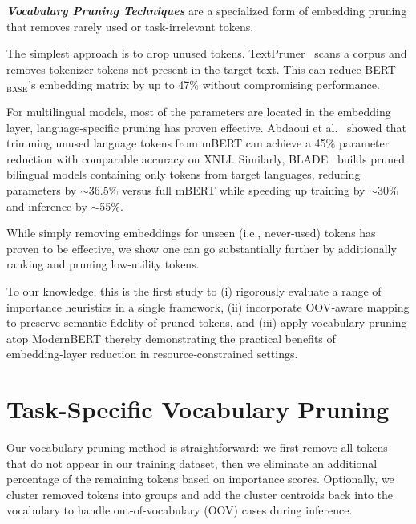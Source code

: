\documentclass[twocolumn]{article}
\begin{document}
\textit{\textbf{Vocabulary Pruning Techniques}} are a specialized form of embedding pruning that removes rarely used or task-irrelevant tokens.

The simplest approach is to drop unused tokens. TextPruner~\cite{shen2022textpruner} scans a corpus and removes tokenizer tokens not present in the target text. This can reduce BERT$_{\text{BASE}}$'s embedding matrix by up to 47\% without compromising performance.

For multilingual models, most of the parameters are located in the embedding layer, language-specific pruning has proven effective. Abdaoui et al.~\cite{abdaoui2020load} showed that trimming unused language tokens from mBERT can achieve a 45\% parameter reduction with comparable accuracy on XNLI. Similarly, BLADE~\cite{nair2023blade} builds pruned bilingual models containing only tokens from target languages, reducing parameters by $\sim$36.5\% versus full mBERT while speeding up training by $\sim$30\% and inference by $\sim$55\%.

While simply removing embeddings for unseen (i.e., never‑used) tokens has proven to be effective, we show one can go substantially further by additionally ranking and pruning low‑utility tokens. 

To our knowledge, this is the first study to (i) rigorously evaluate a range of importance heuristics in a single framework, (ii) incorporate OOV‑aware mapping to preserve semantic fidelity of pruned tokens, and (iii) apply vocabulary pruning atop ModernBERT thereby demonstrating the practical benefits of embedding‑layer reduction in resource‑constrained settings.

\newpage
\section{\fontsize{13}{15.6}\selectfont Task-Specific Vocabulary Pruning}
Our vocabulary pruning method is straightforward: we first remove all tokens that do not appear in our training dataset, then we eliminate an additional percentage of the remaining tokens based on importance scores. 
Optionally, we cluster removed tokens into groups and add the cluster centroids back into the vocabulary to handle out-of-vocabulary (OOV) cases during inference.
\end{document}
